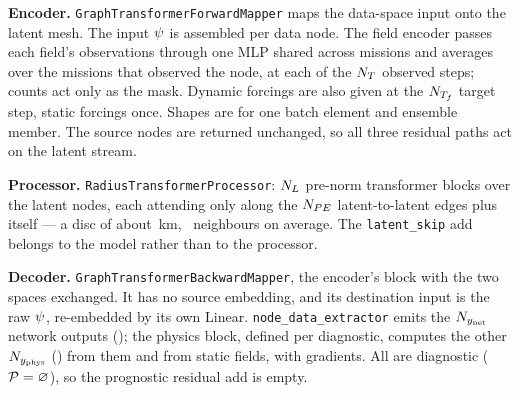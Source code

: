 \documentclass[11pt,landscape]{article}
\newcommand{\figurepage}[2]{%
  \vspace*{\fill}
  \begin{center}\resizebox{\textwidth}{!}{}\end{center}
  \vspace*{\fill}
  {\footnotesize #2\par}
  \clearpage}
\begin{document}
\figurepage{encoder_figure}{%
  \textbf{Encoder.}\;
  \texttt{GraphTransformerForwardMapper} maps the data-space input onto the latent mesh.
  The input $\psi$ is assembled per data node.
  The field encoder passes each field's observations through one MLP shared across
  missions and averages over the missions that observed the node, at each of the $N_{T}$
  observed steps; counts act only as the mask.
  Dynamic forcings are also given at the $N_{T_f}$ target step, static forcings once.
  Shapes are for one batch element and ensemble member.
  The source nodes are returned unchanged, so all three residual paths act on the latent
  stream.}

\figurepage{processor_figure}{%
  \textbf{Processor.}\;
  \texttt{RadiusTransformerProcessor}: $N_{L}$ pre-norm transformer blocks over the latent
  nodes, each attending only along the $N_{PE}$ latent-to-latent edges plus itself ---
  a disc of about \valproccutoffkm\,km, \valprocdegmean\ neighbours on average.
  The \texttt{latent\_skip} add belongs to the model rather than to the processor.}

\figurepage{decoder_figure}{%
  \textbf{Decoder.}\;
  \texttt{GraphTransformerBackwardMapper}, the encoder's block with the two spaces
  exchanged.  It has no source embedding, and its destination input is the raw
  $\psi$, re-embedded by its own Linear.
  \texttt{node\_data\_extractor} emits the $N_{y_{\mathrm{net}}}$ network outputs
  (\valnetnamesplain); the physics block, defined per diagnostic, computes the other
  $N_{y_{\mathrm{phys}}}$ (\valphysnamesplain) from them and from static fields, with gradients.
  All are diagnostic ($\mathcal{P} = \varnothing$), so the prognostic residual add is empty.}
\end{document}
